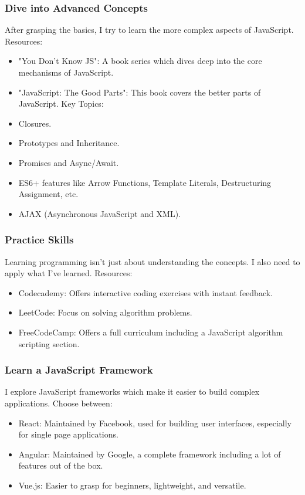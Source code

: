 \documentclass[a4paper, 11pt]{report}
\begin{document}
\subsubsection{Dive into Advanced Concepts}

After grasping the basics, I try to learn the more complex aspects of JavaScript.
Resources:
\begin{itemize}
\item	"You Don’t Know JS": A book series which dives deep into the core mechanisms of JavaScript.
\item	"JavaScript: The Good Parts": This book covers the better parts of JavaScript.
Key Topics:
\item	Closures.
\item	Prototypes and Inheritance.
\item	Promises and Async/Await.
\item	ES6+ features like Arrow Functions, Template Literals, Destructuring Assignment, etc.
\item	AJAX (Asynchronous JavaScript and XML).
\end{itemize}

\subsubsection{Practice Skills}

Learning programming isn't just about understanding the concepts. I also need to apply what I've learned.
Resources:
\begin{itemize}
\item	Codecademy: Offers interactive coding exercises with instant feedback.
\item	LeetCode: Focus on solving algorithm problems.
\item	FreeCodeCamp: Offers a full curriculum including a JavaScript algorithm scripting section.
\end{itemize}

\subsubsection{Learn a JavaScript Framework}

I explore JavaScript frameworks which make it easier to build complex applications.
Choose between:
\begin{itemize}
\item	React: Maintained by Facebook, used for building user interfaces, especially for single page applications.
\item	Angular: Maintained by Google, a complete framework including a lot of features out of the box.
\item	Vue.js: Easier to grasp for beginners, lightweight, and versatile.
\end{itemize}
\end{document}
